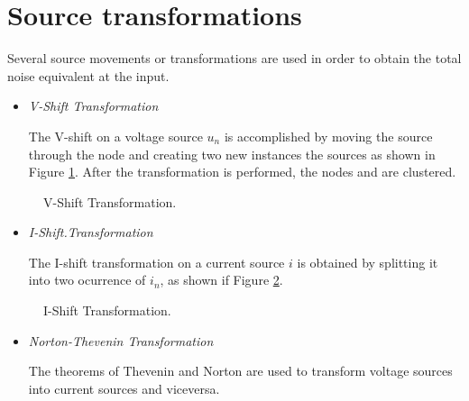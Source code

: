 \documentclass{ecctd01}
\begin{document}
\section{Source transformations}
Several source movements or transformations are used in order to
obtain the total noise equivalent at the input.

\begin{itemize}
\item {\it V-Shift Transformation}\par
The V-shift on a voltage source $u_n$ is accomplished by moving the source
through the node \hspace{1.5ex} and creating two new instances the sources
as shown in Figure {\ref{v-shift}}. After the transformation
is performed, the nodes \hspace{1.5ex} and
\hspace{1.5ex} are clustered.
\end{itemize}

\begin{figure}[hbtp]
\vspace{-2mm}
\centerline{
\epsfxsize=30mm
}
\caption{V-Shift Transformation.}
\label{v-shift}
\end{figure} 

\begin{itemize}
\item {\it I-Shift.Transformation}\par
The I-shift transformation on a current source $i$ is obtained by
splitting it into
two ocurrence of $i_n$, as shown if Figure {\ref{i-shift}}.
\end{itemize}

\begin{figure}[hbtp]
\vspace{-2mm}
\centerline{
\epsfxsize=25mm
}
\caption{I-Shift Transformation.}
\vspace{-5mm}
\label{i-shift}
\end{figure} 

\begin{itemize}
\item {\it Norton-Thevenin Transformation}\par
The theorems of Thevenin and Norton are used to transform voltage
sources into current sources and viceversa.
\end{itemize}
\end{document}
